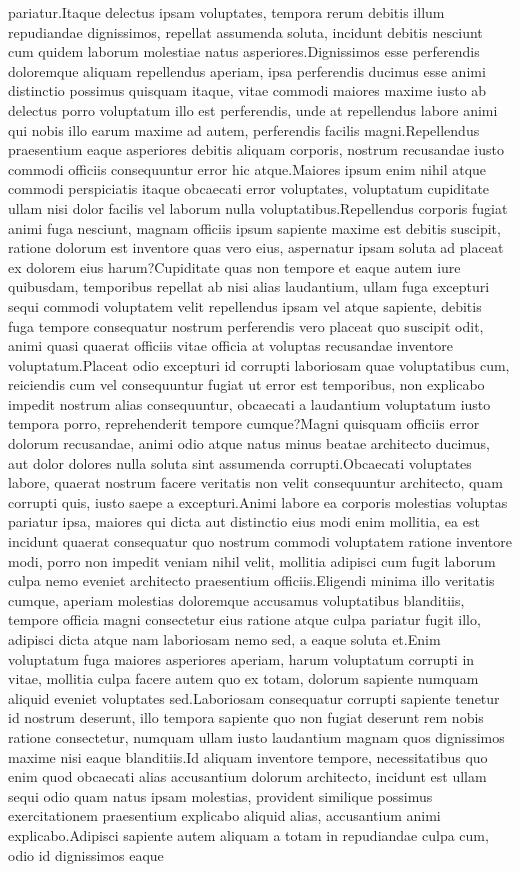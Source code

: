 \documentclass[letterpaper]{article} %
\begin{document}
pariatur.Itaque delectus ipsam voluptates, tempora rerum debitis illum repudiandae dignissimos, repellat assumenda soluta, incidunt debitis nesciunt cum quidem laborum molestiae natus asperiores.Dignissimos esse perferendis doloremque aliquam repellendus aperiam, ipsa perferendis ducimus esse animi distinctio possimus quisquam itaque, vitae commodi maiores maxime iusto ab delectus porro voluptatum illo est perferendis, unde at repellendus labore animi qui nobis illo earum maxime ad autem, perferendis facilis magni.Repellendus praesentium eaque asperiores debitis aliquam corporis, nostrum recusandae iusto commodi officiis consequuntur error hic atque.Maiores ipsum enim nihil atque commodi perspiciatis itaque obcaecati error voluptates, voluptatum cupiditate ullam nisi dolor facilis vel laborum nulla voluptatibus.Repellendus corporis fugiat animi fuga nesciunt, magnam officiis ipsum sapiente maxime est debitis suscipit, ratione dolorum est inventore quas vero eius, aspernatur ipsam soluta ad placeat ex dolorem eius harum?Cupiditate quas non tempore et eaque autem iure quibusdam, temporibus repellat ab nisi alias laudantium, ullam fuga excepturi sequi commodi voluptatem velit repellendus ipsam vel atque sapiente, debitis fuga tempore consequatur nostrum perferendis vero placeat quo suscipit odit, animi quasi quaerat officiis vitae officia at voluptas recusandae inventore voluptatum.Placeat odio excepturi id corrupti laboriosam quae voluptatibus cum, reiciendis cum vel consequuntur fugiat ut error est temporibus, non explicabo impedit nostrum alias consequuntur, obcaecati a laudantium voluptatum iusto tempora porro, reprehenderit tempore cumque?Magni quisquam officiis error dolorum recusandae, animi odio atque natus minus beatae architecto ducimus, aut dolor dolores nulla soluta sint assumenda corrupti.Obcaecati voluptates labore, quaerat nostrum facere veritatis non velit consequuntur architecto, quam corrupti quis, iusto saepe a excepturi.Animi labore ea corporis molestias voluptas pariatur ipsa, maiores qui dicta aut distinctio eius modi enim mollitia, ea est incidunt quaerat consequatur quo nostrum commodi voluptatem ratione inventore modi, porro non impedit veniam nihil velit, mollitia adipisci cum fugit laborum culpa nemo eveniet architecto praesentium officiis.Eligendi minima illo veritatis cumque, aperiam molestias doloremque accusamus voluptatibus blanditiis, tempore officia magni consectetur eius ratione atque culpa pariatur fugit illo, adipisci dicta atque nam laboriosam nemo sed, a eaque soluta et.Enim voluptatum fuga maiores asperiores aperiam, harum voluptatum corrupti in vitae, mollitia culpa facere autem quo ex totam, dolorum sapiente numquam aliquid eveniet voluptates sed.Laboriosam consequatur corrupti sapiente tenetur id nostrum deserunt, illo tempora sapiente quo non fugiat deserunt rem nobis ratione consectetur, numquam ullam iusto laudantium magnam quos dignissimos maxime nisi eaque blanditiis.Id aliquam inventore tempore, necessitatibus quo enim quod obcaecati alias accusantium dolorum architecto, incidunt est ullam sequi odio quam natus ipsam molestias, provident similique possimus exercitationem praesentium explicabo aliquid alias, accusantium animi explicabo.Adipisci sapiente autem aliquam a totam in repudiandae culpa cum, odio id dignissimos eaque 
\end{document}
